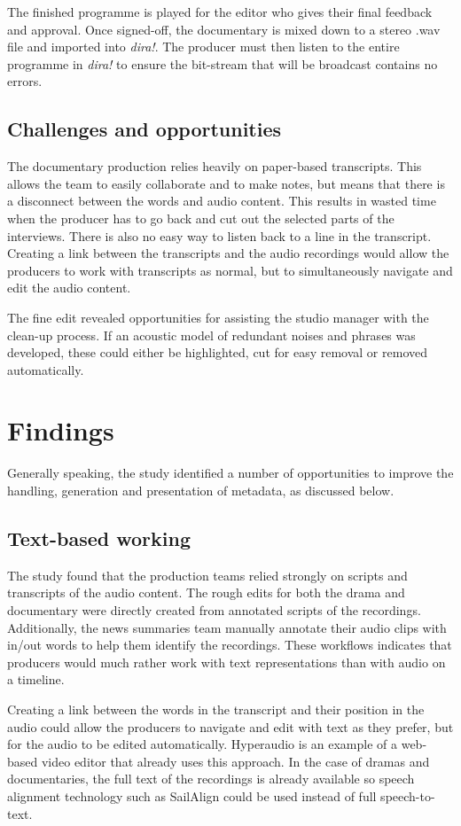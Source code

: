 The finished programme is played for the editor who gives their final feedback
and approval.  Once signed-off, the documentary is mixed down to a stereo .wav
file and imported into \textit{dira!}. The producer must then listen to the
entire programme in \textit{dira!} to ensure the bit-stream that will be
broadcast contains no errors.

\subsection{Challenges and opportunities}
The documentary production relies heavily on paper-based transcripts. This
allows the team to easily collaborate and to make notes, but means that there
is a disconnect between the words and audio content. This results in wasted
time when the producer has to go back and cut out the selected parts of the
interviews. There is also no easy way to listen back to a line in the
transcript. Creating a link between the transcripts and the audio recordings
would allow the producers to work with transcripts as normal, but to
simultaneously navigate and edit the audio content.

The fine edit revealed opportunities for assisting the studio manager with the
clean-up process. If an acoustic model of redundant noises and phrases was 
developed, these could either be highlighted, cut for easy removal or removed
automatically.

\section{Findings}\label{sec:summary}
Generally speaking, the study identified a number of opportunities to improve
the handling, generation and presentation of metadata, as discussed below.

\subsection{Text-based working}
The study found that the production teams relied strongly on scripts and
transcripts of the audio content. The rough edits for both the drama and
documentary were directly created from annotated scripts of the recordings.
Additionally, the news summaries team manually annotate their audio clips with
in/out words to help them identify the recordings. These workflows indicates
that producers would much rather work with text representations than with audio
on a timeline.

Creating a link between the words in the transcript and their position in the
audio could allow the producers to navigate and edit with text as they prefer,
but for the audio to be edited automatically. Hyperaudio \cite{Boas2012} is an
example of a web-based video editor that already uses this approach. In the
case of dramas and documentaries, the full text of the recordings is already
available so speech alignment technology such as SailAlign
\cite{Katsamanis2011} could be used instead of full speech-to-text.

